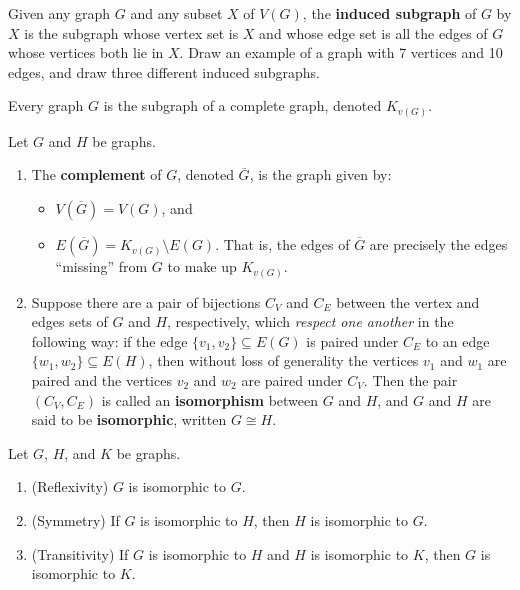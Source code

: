 \begin{example} Given any graph $G$ and any subset $X$ of $V(G)$, the \textbf{induced subgraph} of $G$ by $X$ is the subgraph whose vertex set is $X$ and whose edge set is all the edges of $G$ whose vertices both lie in $X$.  Draw an example of a graph with 7 vertices and 10 edges, and draw three different induced subgraphs.
\end{example}

\begin{lemma} Every graph $G$ is the subgraph of a complete graph, denoted $K_{v(G)}$.
\end{lemma}

\begin{definition} Let $G$ and $H$ be graphs.
    \begin{enumerate}
    \item The \textbf{complement} of $G$, denoted $\overline{G}$, is the graph given by:
    \begin{itemize}
        \item $V(\overline{G}) = V(G)$, and
        \item $E(\overline{G}) = K_{v(G)} \setminus E(G)$.  That is, the edges of $\overline{G}$ are precisely the edges ``missing'' from $G$ to make up $K_{v(G)}$.
    \end{itemize}

    \item Suppose there are a pair of bijections $C_V$ and $C_E$ between the vertex and edges sets of $G$ and $H$, respectively, which \textit{respect one another} in the following way: if the edge $\{v_1, v_2\}\subseteq E(G)$ is paired under $C_E$ to an edge $\{w_1, w_2\}\subseteq E(H)$, then without loss of generality the vertices $v_1$ and $w_1$ are paired and the vertices $v_2$ and $w_2$ are paired under $C_V$.  Then the pair $(C_V, C_E)$ is called an \textbf{isomorphism} between $G$ and $H$, and $G$ and $H$ are said to be \textbf{isomorphic}, written $G \cong H$.
\end{enumerate}
\end{definition}

\begin{theorem}  Let $G$, $H$, and $K$ be graphs.
\begin{enumerate}
    \item (Reflexivity) $G$ is isomorphic to $G$.
    \item (Symmetry) If $G$ is isomorphic to $H$, then $H$ is isomorphic to $G$.
    \item (Transitivity) If $G$ is isomorphic to $H$ and $H$ is isomorphic to $K$, then $G$ is isomorphic to $K$.
\end{enumerate}
\end{theorem}


